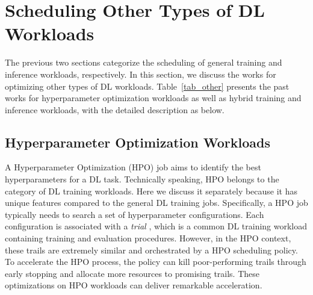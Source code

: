 \section{Scheduling Other Types of DL Workloads}
\label{sec_other_workload}




The previous two sections categorize the scheduling of general training and inference workloads, respectively. In this section, we discuss the works for optimizing other types of DL workloads.
Table~\ref{tab_other} presents the past works for hyperparameter optimization workloads as well as hybrid training and inference workloads, with the detailed description as below. 

\subsection{Hyperparameter Optimization Workloads}

A Hyperparameter Optimization (HPO) job aims to identify the best hyperparameters for a DL task. Technically speaking, HPO belongs to the category of DL training workloads. Here we discuss it separately because it has unique features compared to the general DL training jobs. Specifically, a HPO job typically needs to search a set of hyperparameter configurations. Each configuration is associated with a \emph{trial} \cite{RubberBand}, which is a common DL training workload containing training and evaluation procedures. However, in the HPO context, these trails are extremely similar and orchestrated by a HPO scheduling policy. To accelerate the HPO process, the policy can kill poor-performing trails through early stopping and allocate more resources to promising trails. These optimizations on HPO workloads can deliver remarkable acceleration.





